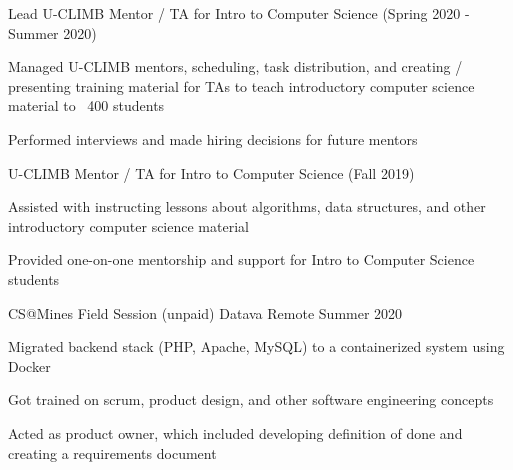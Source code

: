 \begin{cventries}
    \ifcv
    \vspace{-1.0mm}
    \else
    \vspace{-6.0mm}
    \fi
    \cventry
    {Lead U-CLIMB Mentor / TA for Intro to Computer Science (Spring 2020 - Summer 2020)}
    {}
    {}
      {}
    {
    \begin{cvitems}
      \item {Managed U-CLIMB mentors, scheduling, task distribution, and creating / presenting training material for TAs to teach introductory computer science material to ~400 students}
      \item {Performed interviews and made hiring decisions for future mentors}
    \end{cvitems}
    }
    {}
    \cventry
    {U-CLIMB Mentor / TA for Intro to Computer Science (Fall 2019)}
    {}
    {}
    {}
    {
      \ifcv
      \begin{cvitems}
        \item {Assisted with instructing lessons about algorithms, data structures, and other introductory computer science material}
        \item {Provided one-on-one mentorship and support for Intro to Computer Science students}
      \end{cvitems}
      \fi
    }
    {}
    \ifcv
    \vspace{-1.0mm}
    \else
    \vspace{-4.0mm}
    \fi


      \ifcv
    \cventry
    {CS@Mines Field Session (unpaid)}
    {Datava}
    {Remote}
    {Summer 2020}
    {
      \begin{cvitems}
        \item Migrated backend stack (PHP, Apache, MySQL) to a containerized system using Docker
        \item Got trained on scrum, product design, and other software engineering concepts
        \item Acted as product owner, which included developing definition of done and creating a requirements document
      \end{cvitems}
    }
    {}

    


\end{cventries}
